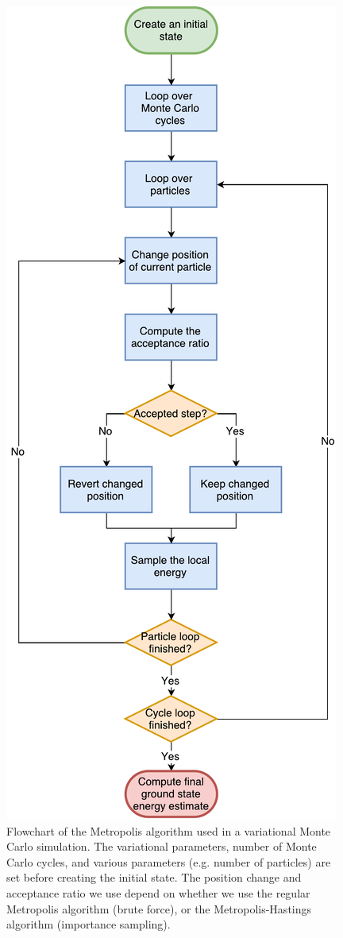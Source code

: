 \documentclass[../main.tex]{subfiles}
\begin{document}
\begin{figure}[!ht]
    \centering
    \includegraphics[scale=0.5]{figures/Metropolis_Flowchart}
    \caption{Flowchart of the Metropolis algorithm used in a variational Monte Carlo simulation. The variational parameters, number of Monte Carlo cycles, and various parameters (e.g. number of particles) are set before creating the initial state. The position change and acceptance ratio we use depend on whether we use the regular Metropolis algorithm (brute force), or the Metropolis-Hastings algorithm (importance sampling).}
    \label{fig: Metropolis_Flowchart}
\end{figure}
\end{document}
